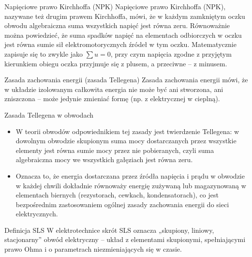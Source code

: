 \begin{frame}{Napięciowe prawo Kirchhoffa (NPK)}
	Napięciowe prawo Kirchhoffa (NPK), nazywane też drugim prawem Kirchhoffa,
	mówi, że w każdym zamkniętym oczku obwodu algebraiczna suma wszystkich napięć jest równa zeru.
	Równoważnie można powiedzieć, że suma spadków napięć na elementach odbiorczych w oczku
	jest równa sumie sił elektromotorycznych źródeł w tym oczku.
	Matematycznie zapisuje się to zwykle jako $\sum u = 0$,
	przy czym napięcia zgodne z przyjętym kierunkiem obiegu oczka przyjmuje się z plusem,
	a przeciwne – z minusem.
\end{frame}

\begin{frame}{Zasada zachowania energii (zasada Tellegena)}
	Zasada zachowania energii mówi, że w układzie izolowanym całkowita energia
	nie może być ani stworzona, ani zniszczona – może jedynie zmieniać formę
	(np. z elektrycznej w cieplną).
	\begin{block}{Zasada Tellegena w obwodach}
		\begin{itemize}
			\item[\bt] W teorii obwodów odpowiednikiem tej zasady jest twierdzenie Tellegena:
			      w dowolnym obwodzie skupionym suma mocy dostarczanych przez wszystkie elementy
			      jest równa sumie mocy przez nie pobieranych, czyli suma algebraiczna mocy
			      we wszystkich gałęziach jest równa zeru.
			\item[\bt] Oznacza to, że energia dostarczana przez źródła napięcia i prądu
			      w obwodzie w każdej chwili dokładnie równoważy energię zużywaną lub magazynowaną
			      w elementach biernych (rezystorach, cewkach, kondensatorach),
			      co jest bezpośrednim zastosowaniem ogólnej zasady zachowania energii
			      do sieci elektrycznych.
		\end{itemize}
	\end{block}
\end{frame}

\begin{frame}{Definicja SLS}
	W elektrotechnice skrót SLS oznacza „skupiony, liniowy, stacjonarny” obwód elektryczny –
	układ z elementami skupionymi, spełniającymi prawo Ohma
	i o parametrach niezmieniających się w czasie.
\end{frame}